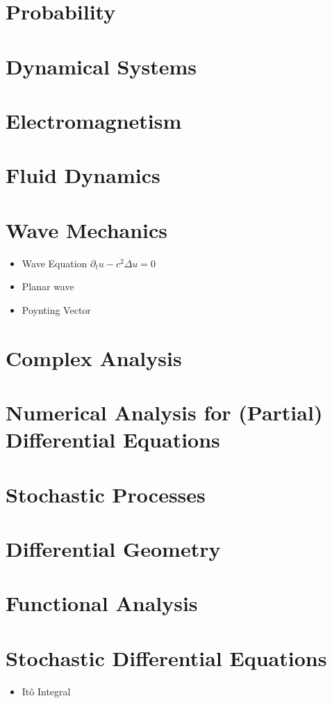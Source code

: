 \documentclass[10pt]{article}
\begin{document}
\section{Probability}
\section{Dynamical Systems}
\section{Electromagnetism}
\section{Fluid Dynamics}
\section{Wave Mechanics}
	\begin{itemize}
	\item Wave Equation $\partial_t u-c^2\Delta u=0$
	\item Planar wave
	\item Poynting Vector
	\end{itemize}
\section{Complex Analysis}
\section{Numerical Analysis for (Partial) Differential Equations}
\section{Stochastic Processes}
\section{Differential Geometry}
\section{Functional Analysis}
\section{Stochastic Differential Equations}
\begin{itemize}
	\item It\^o Integral
	\end{itemize}
\end{document}
